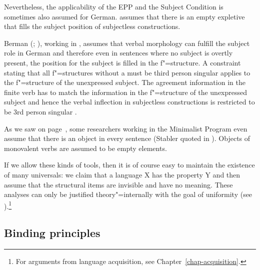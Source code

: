 \noindent
Nevertheless, the applicability of the EPP and the Subject Condition is sometimes also assumed for German.
\citet[]{Grewendorf93}
assumes that there is an empty expletive that fills the subject position of subjectless constructions.

Berman (\citeyear[]{Berman99a};
\citeyear[Chapter~4]{Berman2003a}), working in \lfg, assumes that verbal morphology can fulfill the subject role
in German and therefore even in sentences where no subject is overtly present, the position for the subject is filled
in the f"=structure. A constraint stating that all f"=structures without a \predv must be third
person singular applies to the f"=structure of the unexpressed subject. The agreement information in
the finite verb has to match the information in the f"=structure of the unexpressed subject and
hence the verbal inflection in subjectless constructions is restricted to be 3rd person singular \citep{Berman99a}. 

As we saw on page~\pageref{Seite-leeres-Objekt}, some researchers working in the Minimalist Program even
assume that there is an object in every sentence (Stabler quoted in
\citet[, 124]{Veenstra98a}). Objects of monovalent verbs are assumed to be empty
elements.
 
If we allow these kinds of tools, then it is of course easy to maintain the existence of many universals: we claim that a language X has the property Y and then assume that
the structural items are invisible and have no meaning. These analyses can only be justified theory"=internally with the goal of uniformity
(see \citealp[Section~2.1.2]{CJ2005a}).\footnote{
	For arguments from language acquisition, see Chapter~\ref{chap-acquisition}.
	}

\subsection{Binding principles}

